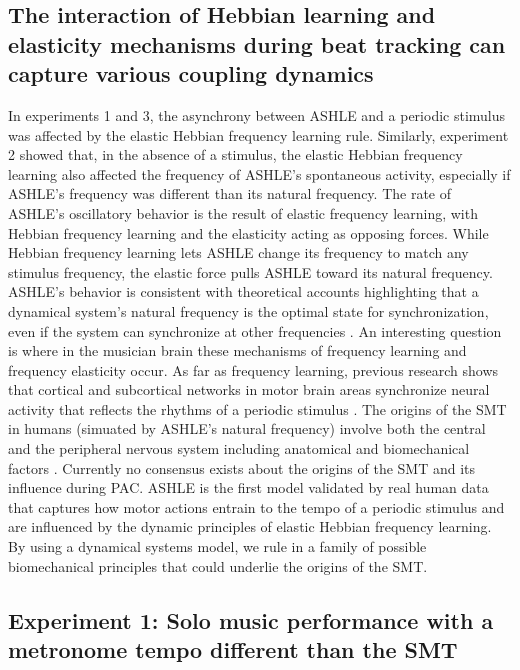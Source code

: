 \documentclass[10pt,letterpaper]{article}
\begin{document}
\subsection*{The interaction of Hebbian learning and elasticity mechanisms during beat tracking can capture various coupling dynamics}

In experiments 1 and 3, the asynchrony between ASHLE and a periodic stimulus was affected by the elastic Hebbian frequency learning rule. Similarly, experiment 2 showed that, in the absence of a stimulus, the elastic Hebbian frequency learning also affected the frequency of ASHLE's spontaneous activity, especially if ASHLE's frequency was different than its natural frequency. The rate of ASHLE's oscillatory behavior is the result of elastic frequency learning, with Hebbian frequency learning and the elasticity acting as opposing forces. While Hebbian frequency learning lets ASHLE change its frequency to match any stimulus frequency, the elastic force pulls ASHLE toward its natural frequency. ASHLE's behavior is consistent with theoretical accounts highlighting that a dynamical system's natural frequency is the optimal state for synchronization, even if the system can synchronize at other frequencies \cite{von1937nature, haken1985theoretical, kelso1997relative, scheurich2018tapping}. An interesting question is where in the musician brain these mechanisms of frequency learning and frequency elasticity occur. As far as frequency learning, previous research shows that cortical and subcortical networks in motor brain areas synchronize neural activity that reflects the rhythms of a periodic stimulus \cite{large2015neural, chen2008moving, grahn2009feeling, fujioka2012internalized}. The origins of the SMT in humans (simuated by ASHLE's natural frequency) involve both the central and the peripheral nervous system \cite{latash1992virtual} including anatomical and biomechanical factors \cite{goodman2000advantages}. Currently no consensus exists about the origins of the SMT and its influence during PAC. ASHLE is the first model validated by real human data that captures how motor actions entrain to the tempo of a periodic stimulus and are influenced by the dynamic principles of elastic Hebbian frequency learning. By using a dynamical systems model, we rule in a family of possible biomechanical principles \cite{bose2019neuromechanistic} that could underlie the origins of the SMT.

\subsection*{Experiment 1: Solo music performance with a metronome tempo different than the SMT}
\end{document}
